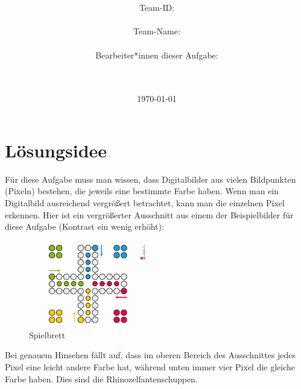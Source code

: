 \documentclass[a4paper,10pt,ngerman]{scrartcl}
\title{\textbf{\Huge\Aufgabe}}
\author{\LARGE Team-ID: \LARGE \TeamId \\\\
	    \LARGE Team-Name: \LARGE \TeamName \\\\
	    \LARGE Bearbeiter*innen dieser Aufgabe: \\ 
	    \LARGE \Namen\\\\}
\date{\LARGE\today}
\begin{document}
\maketitle
\tableofcontents

\vspace{0.5cm}





\section{Lösungsidee}
Für diese Aufgabe muss man wissen, dass Digitalbilder aus vielen Bildpunkten (Pixeln) bestehen, die jeweils eine bestimmte Farbe haben. Wenn man ein Digitalbild ausreichend vergrößert betrachtet, kann man die einzelnen Pixel erkennen. Hier ist ein vergrößerter Ausschnitt aus einem der Beispielbilder für diese Aufgabe (Kontrast ein wenig erhöht): \\
\begin{figure} 
\includegraphics[width=0.5\textwidth]{mensch-aergere-dich-nicht-spielfeld}
\centering
\caption{Spielbrett}
\end{figure}Bei genauem Hinsehen fällt auf, dass im oberen Bereich des Ausschnittes jedes Pixel eine leicht andere Farbe hat, während unten immer vier Pixel die gleiche Farbe haben. 
Dies sind die Rhinozelfantenschuppen. 
\end{document}

